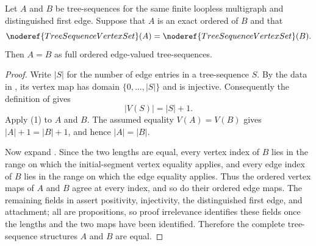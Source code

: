 \begin{lemma}
Let $A$ and $B$ be tree-sequences for the same finite loopless
multigraph and distinguished first edge.  Suppose that $A$ is an exact
ordered  of $B$ and that
\[
 \noderef{TreeSequenceVertexSet}(A)=
 \noderef{TreeSequenceVertexSet}(B).
\]
Then $A=B$ as full ordered edge-valued tree-sequences.
\end{lemma}
\begin{proof}
Write $|S|$ for the number of edge entries in a tree-sequence $S$.
By the data in , its vertex map has domain
$\{0,\ldots,|S|\}$ and is injective.  Consequently the definition of
 gives
\[
             |V(S)|=|S|+1.                                      \tag{1}
\]
Apply (1) to $A$ and $B$.  The assumed equality $V(A)=V(B)$ gives
$|A|+1=|B|+1$, and hence $|A|=|B|$.

Now expand .  Since the two lengths
are equal, every vertex index of $B$ lies in the range on which the
initial-segment vertex equality applies, and every edge index of $B$
lies in the range on which the edge equality applies.  Thus the ordered
vertex maps of $A$ and $B$ agree at every index, and so do their
ordered edge maps.  The remaining fields in 
assert positivity, injectivity, the distinguished first edge, and
attachment; all are propositions, so proof irrelevance identifies these
fields once the lengths and the two maps have been identified.  Therefore
the complete tree-sequence structures $A$ and $B$ are equal.
\end{proof}
